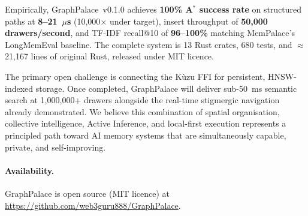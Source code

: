 \documentclass[11pt,a4paper]{article}
\begin{document}
Empirically, GraphPalace~v0.1.0 achieves \textbf{100\% A$^*$ success rate} on
structured paths at \textbf{8--21~$\mu$s} (10,000$\times$ under target), insert
throughput of \textbf{50,000 drawers/second}, and TF-IDF recall@10 of
\textbf{96--100\%} matching MemPalace's LongMemEval baseline.  The complete
system is 13 Rust crates, 680 tests, and $\approx$21,167 lines of original
Rust, released under MIT licence.

The primary open challenge is connecting the Kùzu FFI for persistent,
HNSW-indexed storage.  Once completed, GraphPalace will deliver sub-50~ms
semantic search at 1,000,000+ drawers alongside the real-time stigmergic
navigation already demonstrated.  We believe this combination of spatial
organisation, collective intelligence, Active Inference, and local-first
execution represents a principled path toward AI memory systems that are
simultaneously capable, private, and self-improving.

\paragraph{Availability.}
GraphPalace is open source (MIT licence) at
\url{https://github.com/web3guru888/GraphPalace}.

\end{document}
